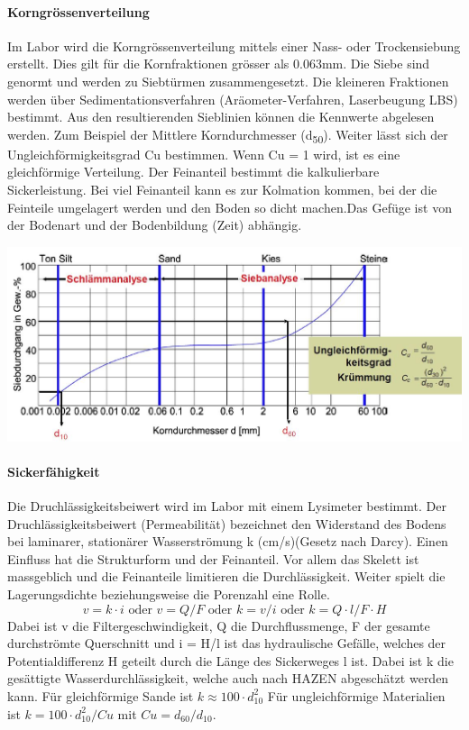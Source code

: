 \documentclass[9pt, openright=false]{scrartcl}
\begin{document}
\paragraph{Korngrössenverteilung} Im Labor wird die Korngrössenverteilung mittels einer Nass- oder Trockensiebung erstellt. Dies gilt für die Kornfraktionen grösser als 0.063mm. Die Siebe sind genormt und werden zu Siebtürmen zusammengesetzt. Die kleineren Fraktionen werden über Sedimentationsverfahren (Aräometer-Verfahren, Laserbeugung LBS)  bestimmt. Aus den resultierenden Sieblinien können die Kennwerte abgelesen werden. Zum Beispiel der Mittlere Korndurchmesser (d\textsubscript{50}). Weiter lässt sich der Ungleichförmigkeitsgrad Cu bestimmen. Wenn Cu = 1 wird, ist es eine gleichförmige Verteilung. Der Feinanteil bestimmt die kalkulierbare Sickerleistung. Bei viel Feinanteil kann es zur Kolmation kommen, bei der die Feinteile umgelagert werden und den Boden so \glqq dicht machen.\grqq Das Gefüge ist von der Bodenart und der Bodenbildung (Zeit) abhängig.  
\begin{center}
\includegraphics[width=\textwidth]{images/siebkurve}
\end{center}
\paragraph{Sickerfähigkeit} Die Druchlässigkeitsbeiwert wird im Labor mit einem Lysimeter bestimmt. Der Druchlässigkeitsbeiwert (Permeabilität) bezeichnet den Widerstand des Bodens bei laminarer, stationärer Wasserströmung k (cm/s)(Gesetz nach Darcy). Einen Einfluss hat die Strukturform und der Feinanteil. Vor allem das Skelett ist massgeblich und die Feinanteile limitieren die Durchlässigkeit. Weiter spielt die Lagerungsdichte beziehungsweise die Porenzahl eine Rolle.\[v = k \cdot i \textrm{ oder } v = Q/F \textrm{ oder } k = v/i \textrm{ oder } k = Q \cdot l / F \cdot H\]
Dabei ist v die Filtergeschwindigkeit, Q die Durchflussmenge, F der gesamte durchströmte Querschnitt und i = H/l ist das hydraulische Gefälle, welches der Potentialdifferenz H geteilt durch die Länge des Sickerweges l ist. Dabei ist k die gesättigte Wasserdurchlässigkeit, welche auch nach HAZEN abgeschätzt werden kann. Für gleichförmige Sande ist $k \approx 100 \cdot d_{10}^2$ Für ungleichförmige Materialien ist $k = 100 \cdot d_{10}^2 / Cu $ mit $Cu = d_{60}/d_{10}$.
\end{document}
